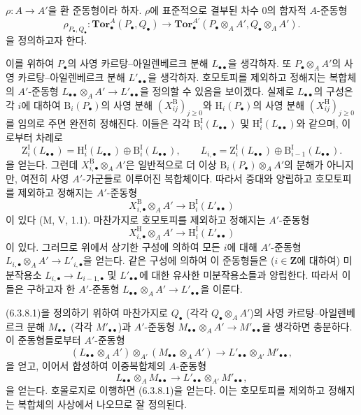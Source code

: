 \begin{env}[6.3.8]
\label{III.6.3.8-fr}
$\rho:A\to A'$을 환 준동형이라 하자. $\rho$에 표준적으로 결부된 차수
0의 함자적 $A$-준동형
\[
  \rho_{P_\bullet,Q_\bullet}:
  \mathbf{Tor}_\bullet^A(P_\bullet,Q_\bullet)
  \longrightarrow
  \mathbf{Tor}_\bullet^{A'}
  (P_\bullet\otimes_A A',Q_\bullet\otimes_A A').
  \tag{6.3.8.1}\label{III.6.3.8.1.fr}
\]
을 정의하고자 한다.

이를 위하여 $P_\bullet$의 사영 카르탕--아일렌베르크 분해
$L_{\bullet\bullet}$을 생각하자. 또 $P_\bullet\otimes_A A'$의 사영
카르탕--아일렌베르크 분해 $L'_{\bullet\bullet}$을 생각하자.
호모토피를 제외하고 정해지는 복합체의 $A'$-준동형
$L_{\bullet\bullet}\otimes_A A'\to L'_{\bullet\bullet}$을 정의할 수
있음을 보이겠다. 실제로 $L_{\bullet\bullet}$의 구성은 각 $i$에
대하여 $\mathrm B_i(P_\bullet)$의 사영 분해
$(X_{ij}^{\mathrm B})_{j\geqslant0}$와
$\mathrm H_i(P_\bullet)$의 사영 분해
$(X_{ij}^{\mathrm H})_{j\geqslant0}$를 임의로 주면 완전히 정해진다.
이들은 각각 $\mathrm B_i^{\mathrm I}(L_{\bullet\bullet})$ 및
$\mathrm H_i^{\mathrm I}(L_{\bullet\bullet})$와 같으며, 이로부터
차례로
\[
  \mathrm Z_i^{\mathrm I}(L_{\bullet\bullet})
  =\mathrm H_i^{\mathrm I}(L_{\bullet\bullet})
   \oplus\mathrm B_i^{\mathrm I}(L_{\bullet\bullet}),
  \qquad
  L_{i,\bullet}=\mathrm Z_i^{\mathrm I}(L_{\bullet\bullet})
   \oplus\mathrm B_{i-1}^{\mathrm I}(L_{\bullet\bullet}).
\]
을 얻는다. 그런데 $X_{i,\bullet}^{\mathrm B}\otimes_A A'$은 일반적으로
더 이상 $\mathrm B_i(P_\bullet)\otimes_A A'$의 분해가 아니지만,
여전히 사영 $A'$-가군들로 이루어진 복합체이다. 따라서 증대와
양립하고 호모토피를 제외하고 정해지는 $A'$-준동형
\[
  X_{i,\bullet}^{\mathrm B}\otimes_A A'
  \longrightarrow \mathrm B_i^{\mathrm I}(L'_{\bullet\bullet})
\]
이 있다 (M, V, 1.1). 마찬가지로 호모토피를 제외하고 정해지는
$A'$-준동형
\[
  X_{i,\bullet}^{\mathrm H}\otimes_A A'
  \longrightarrow \mathrm H_i^{\mathrm I}(L'_{\bullet\bullet})
\]
이 있다. 그러므로 위에서 상기한 구성에 의하여 모든 $i$에 대해
$A'$-준동형 $L_{i,\bullet}\otimes_A A'\to L'_{i,\bullet}$을 얻는다.
같은 구성에 의하여 이 준동형들은 ($i\in\mathbf Z$에 대하여)
미분작용소 $L_{i,\bullet}\to L_{i-1,\bullet}$ 및
$L'_{\bullet\bullet}$에 대한 유사한 미분작용소들과 양립한다. 따라서
이들은 구하고자 한 $A'$-준동형
$L_{\bullet\bullet}\otimes_A A'\to L'_{\bullet\bullet}$을 이룬다.

(6.3.8.1)을 정의하기 위하여 마찬가지로 $Q_\bullet$ (각각
$Q_\bullet\otimes_A A'$)의 사영 카르탕--아일렌베르크 분해
$M_{\bullet\bullet}$ (각각 $M'_{\bullet\bullet}$)과 $A'$-준동형
$M_{\bullet\bullet}\otimes_A A'\to M'_{\bullet\bullet}$을 생각하면
충분하다. 이 준동형들로부터 $A'$-준동형
\[
  (L_{\bullet\bullet}\otimes_A A')\otimes_{A'}
  (M_{\bullet\bullet}\otimes_A A')
  \longrightarrow
  L'_{\bullet\bullet}\otimes_{A'}M'_{\bullet\bullet},
\]
을 얻고, 이어서 합성하여 이중복합체의 $A$-준동형
\[
  L_{\bullet\bullet}\otimes_A M_{\bullet\bullet}
  \longrightarrow
  L'_{\bullet\bullet}\otimes_{A'}M'_{\bullet\bullet},
\]
을 얻는다. 호몰로지로 이행하면 (6.3.8.1)을 얻는다. 이는 호모토피를
제외하고 정해지는 복합체의 사상에서 나오므로 잘 정의된다.


\end{env}
